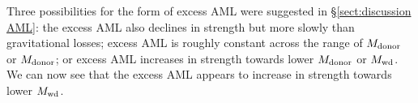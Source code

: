 Three possibilities for the form of excess AML were suggested in \S\ref{sect:discussion AML}: the excess AML also declines in strength but more slowly than gravitational losses; excess AML is roughly constant across the range of $M_{\rm donor}$ or $M_{\rm donor}$; or excess AML increases in strength towards lower $M_{\rm donor}$ or $M_{\rm wd}$.
We can now see that the excess AML appears to increase in strength towards lower $M_{\rm wd}$.



